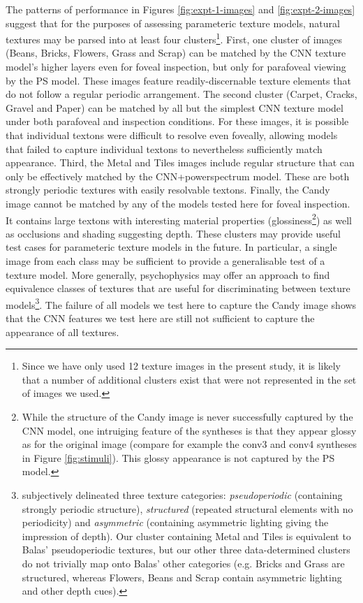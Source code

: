\documentclass[article, 11pt,a4paper,natbib]{apa6}\usepackage[]{graphicx}\usepackage[]{color}
\begin{document}
The patterns of performance in Figures \ref{fig:expt-1-images} and \ref{fig:expt-2-images} suggest that for the purposes of assessing parameteric texture models, natural textures may be parsed into at least four clusters\footnote{
Since we have only used 12 texture images in the present study, it is likely that a number of additional clusters exist that were not represented in the set of images we used.
}.
First, one cluster of images (Beans, Bricks, Flowers, Grass and Scrap) can be matched by the CNN texture model's higher layers even for foveal inspection, but only for parafoveal viewing by the PS model.
These images feature readily-discernable texture elements that do not follow a regular periodic arrangement.
The second cluster (Carpet, Cracks, Gravel and Paper) can be matched by all but the simplest CNN texture model under both parafoveal and inspection conditions.
For these images, it is possible that individual textons \citep[single texture elements;][]{julesz_textons_1981} were difficult to resolve even foveally, allowing models that failed to capture individual textons to nevertheless sufficiently match appearance.
Third, the Metal and Tiles images include regular structure that can only be effectively matched by the CNN+powerspectrum model.
These are both strongly periodic textures with easily resolvable textons.
Finally, the Candy image cannot be matched by any of the models tested here for foveal inspection.
It contains large textons with interesting material properties (glossiness\footnote{
While the structure of the Candy image is never successfully captured by the CNN model, one intruiging feature of the syntheses is that they appear glossy as for the original image (compare for example the conv3 and conv4 syntheses in Figure \ref{fig:stimuli}).
This glossy appearance is not captured by the PS model.
}) as well as occlusions and shading suggesting depth.
These clusters may provide useful test cases for parameteric texture models in the future.
In particular, a single image from each class may be sufficient to provide a generalisable test of a texture model.
More generally, psychophysics may offer an approach to find equivalence classes of textures that are useful for discriminating between texture models\footnote{
\citet{balas_texture_2006} subjectively delineated three texture categories: \textit{pseudoperiodic} (containing strongly periodic structure), \textit{structured} (repeated structural elements with no periodicity) and \textit{asymmetric} (containing asymmetric lighting giving the impression of depth).
Our cluster containing Metal and Tiles is equivalent to Balas' pseudoperiodic textures, but our other three data-determined clusters do not trivially map onto Balas' other categories (e.g. Bricks and Grass are structured, whereas Flowers, Beans and Scrap contain asymmetric lighting and other depth cues).}.
The failure of all models we test here to capture the Candy image shows that the CNN features we test here are still not sufficient to capture the appearance of all textures.
\end{document}
